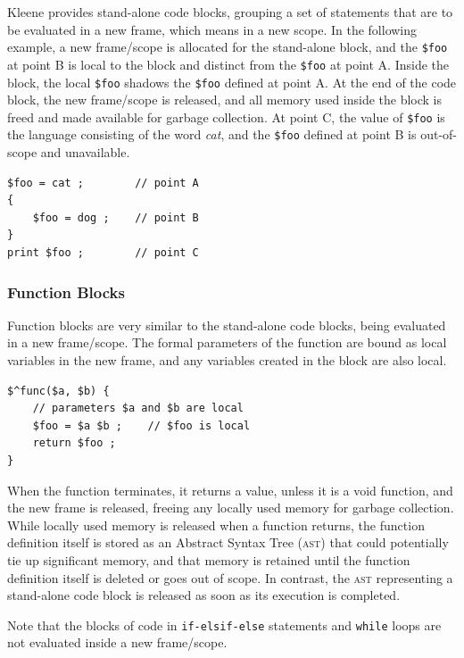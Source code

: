 \documentclass[letterpaper,12pt]{article}
\newcommand{\acro}{\textsc}
\begin{document}
Kleene provides stand-alone code blocks, grouping a set of statements
that are to be evaluated in a new frame, which means in a new scope.
In the following example, a new frame/scope is allocated for the
stand-alone block, and the \verb!$foo! at point B is local to the block
and distinct from the
\verb!$foo! at point A. Inside the block, the local \verb!$foo! shadows
the \verb!$foo! defined at point A.  At the end of the code block, the new
frame/scope is released, and all memory used inside the block is freed
and made available for garbage collection.  At point C, the value of \verb!$foo! is the
language consisting of the word \emph{cat}, and the \verb!$foo! defined
at point B is out-of-scope and unavailable.

\begin{Verbatim}[fontsize=\small]
$foo = cat ;        // point A
{
    $foo = dog ;    // point B
}
print $foo ;        // point C
\end{Verbatim}

\subsubsection{Function Blocks}

Function blocks are very similar to the stand-alone code blocks, being
evaluated in a new frame/scope.  The formal parameters of the function are
bound as local variables in the
new frame, and any variables created in the block are also local.


\begin{Verbatim}[fontsize=\small]
$^func($a, $b) {
    // parameters $a and $b are local
    $foo = $a $b ;    // $foo is local
    return $foo ;
}
\end{Verbatim}

\noindent
When the function terminates, it returns a value, unless it is a void function, and the
new frame is released, freeing any locally used memory for garbage
collection.  While locally used memory is released when a function returns, the
function definition itself is stored as an Abstract Syntax Tree (\acro{ast}) that could
potentially tie up 
significant memory, and that memory is retained until the function definition
itself is deleted or goes out of scope.  In contrast, the \acro{ast} representing a
stand-alone code block is released as soon as its execution is completed.

Note that the blocks of code in \texttt{if-elsif-else} statements and \texttt{while}
loops are not evaluated inside a new frame/scope.
\end{document}
